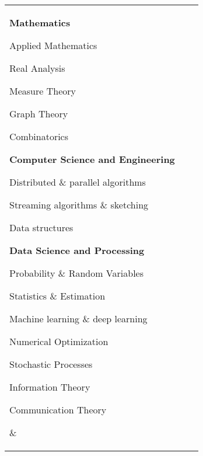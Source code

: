 \documentclass[10pt]{article}
\begin{document}
\begin{tabular}[t]{@{}p{\textwidth-\rcollength-3.5\spacewidth}@{}p{\spacewidth}@{}p{\rcollength}}%

\parbox{1.5\rcollength}{%
\textbf{Mathematics}
\begin{innerlist}
	\item[] Applied Mathematics
	\item[] Real Analysis
	\item[] Measure Theory
	\item[] Graph Theory
	\item[] Combinatorics
\end{innerlist}
%
\textbf{Computer Science and Engineering}
\begin{innerlist}
	\item[] Distributed \& parallel algorithms
	\item[] Streaming algorithms \& sketching
	\item[] Data structures
\end{innerlist}
\textbf{Data Science and Processing}
%
\begin{innerlist}
    \item[] Probability \& Random Variables
    \item[] Statistics \& Estimation
	\item[] Machine learning \& deep learning
	\item[] Numerical Optimization
    \item[] Stochastic Processes
    \item[] Information Theory
    \item[] Communication Theory
\end{innerlist}
}

&


\end{tabular}
\end{document}
